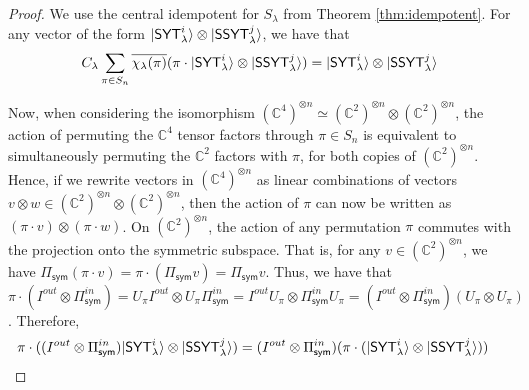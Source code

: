 \documentclass[11pt]{article}
\DeclarePairedDelimiter\ket{\lvert}{\rangle}
\begin{document}
\begin{proof}
    We use the central idempotent for $S_\lambda$ from Theorem \ref{thm:idempotent}. For any vector of the form $\ket{\mathsf{SYT}_{\lambda}^{i}}\otimes \ket{\mathsf{SSYT}_{\lambda}^{j}}$, we have that 
    \[C_{\lambda}\sum_{\pi\in S_n} \overline{\chi_{\lambda}(\pi)}( \pi\cdot \ket{\mathsf{SYT}_{\lambda}^{i}}\otimes \ket{\mathsf{SSYT}_{\lambda}^{j}}  )= \ket{\mathsf{SYT}_{\lambda}^{i}}\otimes \ket{\mathsf{SSYT}_{\lambda}^{j}}\]
    
    Now, when considering the isomorphism $(\mathbb C^4)^{\otimes n}\simeq (\mathbb C^2)^{\otimes n}\otimes (\mathbb C^2)^{\otimes n}$, the action of permuting the $\mathbb C^4$ tensor factors through $\pi\in S_n$ is equivalent to simultaneously permuting the $\mathbb C^2$ factors with $\pi$, for both copies of $(\mathbb C^2)^{\otimes n}$. Hence, if we rewrite vectors in $(\mathbb C^4)^{\otimes n}$ as linear combinations of vectors $v\otimes w \in (\mathbb C^2)^{\otimes n}\otimes (\mathbb C^2)^{\otimes n}$, then the action of $\pi$ can now be written as $(\pi \cdot v)\otimes (\pi\cdot w)$. On $(\mathbb C^2)^{\otimes n}$, the action of any permutation $\pi$ commutes with the projection onto the symmetric subspace. That is, for any $v\in (\mathbb C^2)^{\otimes n}$, we have $\Pi_{\mathsf{sym}} (\pi\cdot v)=\pi\cdot (\Pi_{\mathsf{sym}} v)=\Pi_{\mathsf{sym}}v$. Thus, we have that $\pi \cdot (I^{out}\otimes \Pi_{\mathsf{sym}}^{in}) = U_\pi I^{out} \otimes U_{\pi} \Pi_{\mathsf{sym}}^{in} = I^{out} U_\pi \otimes \Pi_{\mathsf{sym}}^{in} U_{\pi} = (I^{out}\otimes \Pi_{\mathsf{sym}}^{in}) (U_{\pi} \otimes U_{\pi})$. Therefore,
    \begin{align*}
        \pi \cdot ((I^{out}\otimes \Pi_{\mathsf{sym}}^{in}) \ket{\mathsf{SYT}_{\lambda}^{i}}\otimes \ket{\mathsf{SSYT}_{\lambda}^{j}}) &= (I^{out}\otimes \Pi_{\mathsf{sym}}^{in})(\pi \cdot (\ket{\mathsf{SYT}_{\lambda}^{i}}\otimes \ket{\mathsf{SSYT}_{\lambda}^{j}}))
    \end{align*}



\end{proof}
\end{document}
